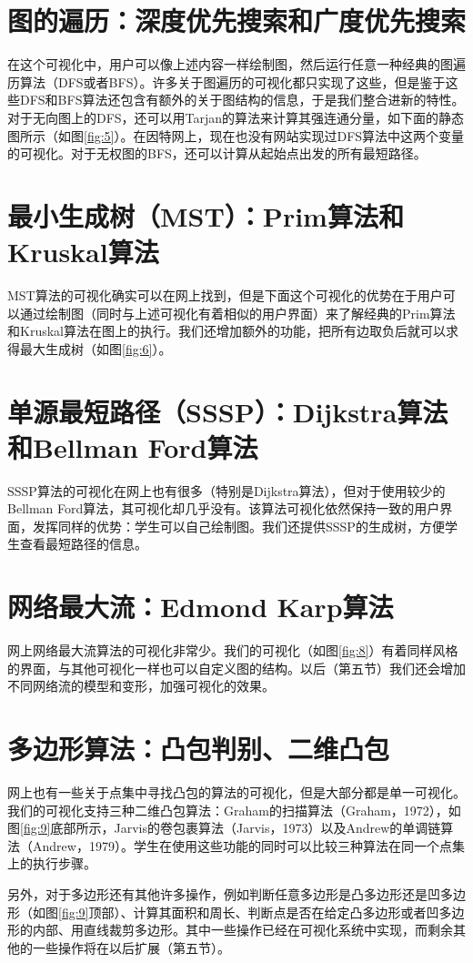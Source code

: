 \section{图的遍历：深度优先搜索和广度优先搜索}
\begin{sectext}
在这个可视化中，用户可以像上述内容一样绘制图，然后运行任意一种经典的图遍历算法（DFS或者BFS）。许多关于图遍历的可视化都只实现了这些，但是鉴于这些DFS和BFS算法还包含有额外的关于图结构的信息，于是我们整合进新的特性。对于无向图上的DFS，还可以用Tarjan的算法来计算其强连通分量，如下面的静态图所示（如图\ref{fig:5}）。在因特网上，现在也没有网站实现过DFS算法中这两个变量的可视化。对于无权图的BFS，还可以计算从起始点出发的所有最短路径。

\end{sectext}
\section{最小生成树（MST）：Prim算法和Kruskal算法}
\begin{sectext}
MST算法的可视化确实可以在网上找到，但是下面这个可视化的优势在于用户可以通过绘制图（同时与上述可视化有着相似的用户界面）来了解经典的Prim算法和Kruskal算法在图上的执行。我们还增加额外的功能，把所有边取负后就可以求得最大生成树（如图\ref{fig:6}）。

\end{sectext}
\section{单源最短路径（SSSP）：Dijkstra算法和Bellman Ford算法}
\begin{sectext}
SSSP算法的可视化在网上也有很多（特别是Dijkstra算法），但对于使用较少的Bellman Ford算法，其可视化却几乎没有。该算法可视化依然保持一致的用户界面，发挥同样的优势：学生可以自己绘制图。我们还提供SSSP的生成树，方便学生查看最短路径的信息。

\end{sectext}
\section{网络最大流：Edmond Karp算法}
\begin{sectext}
网上网络最大流算法的可视化非常少。我们的可视化（如图\ref{fig:8}）有着同样风格的界面，与其他可视化一样也可以自定义图的结构。以后（第五节）我们还会增加不同网络流的模型和变形，加强可视化的效果。

\end{sectext}
\section{多边形算法：凸包判别、二维凸包}
\begin{sectext}
网上也有一些关于点集中寻找凸包的算法的可视化，但是大部分都是单一可视化。我们的可视化支持三种二维凸包算法：Graham的扫描算法（Graham，1972），如图\ref{fig:9}底部所示，Jarvis的卷包裹算法（Jarvis，1973）以及Andrew的单调链算法（Andrew，1979）。学生在使用这些功能的同时可以比较三种算法在同一个点集上的执行步骤。

另外，对于多边形还有其他许多操作，例如判断任意多边形是凸多边形还是凹多边形（如图\ref{fig:9}顶部）、计算其面积和周长、判断点是否在给定凸多边形或者凹多边形的内部、用直线裁剪多边形。其中一些操作已经在可视化系统中实现，而剩余其他的一些操作将在以后扩展（第五节）。
\end{sectext}
